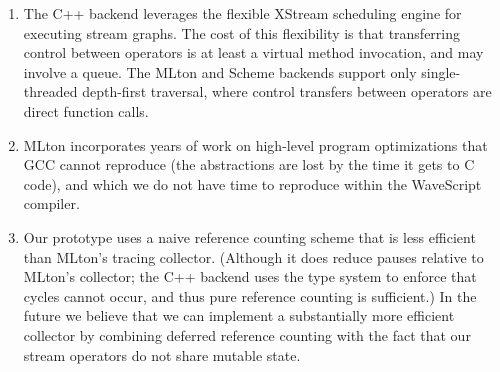 \documentclass[twocolumn]{report}
\newcommand{\ws}{WaveScript}
\begin{document}
\begin{enumerate}

\item The C++ backend leverages the flexible XStream scheduling engine for
executing stream graphs.  The cost of this flexibility is that
transferring control between operators is at least a virtual method
invocation, and may involve a queue. The MLton and Scheme backends
support only single-threaded depth-first traversal, where control
transfers between operators are direct function calls.


\item MLton incorporates years of work on high-level program
optimizations that GCC cannot reproduce (the abstractions are lost by
the time it gets to C code), and which we do not have time to reproduce
within the {\ws} compiler.

\item Our prototype uses a naive reference counting scheme that is less
efficient than MLton's tracing collector.  (Although it does reduce
pauses relative to MLton's collector; the C++ backend uses the type
system to enforce that cycles cannot occur, and thus pure reference
counting is sufficient.) 
%
In the future we believe that we can implement a substantially more
efficient collector by combining deferred reference counting with the
fact that our stream operators do not share mutable state.


\end{enumerate}
%
\end{document}
